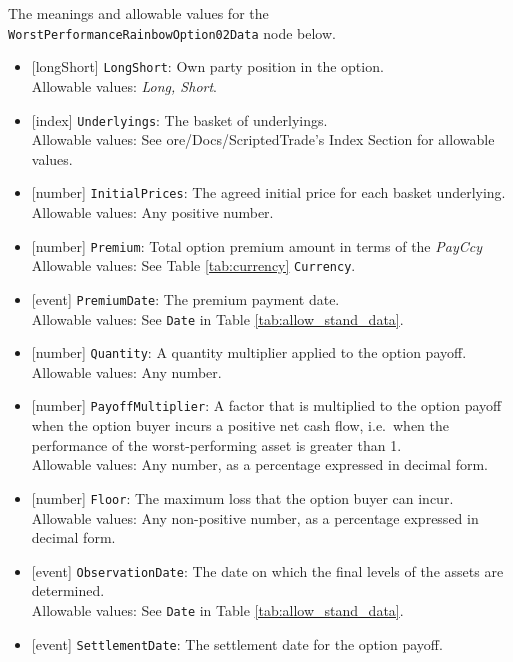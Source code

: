 The meanings and allowable values for the \lstinline!WorstPerformanceRainbowOption02Data! node below.

\begin{itemize} 
  \item{}[longShort] \lstinline!LongShort!: Own party position in the option. \\
  Allowable values: \emph{Long, Short}.
  \item{}[index] \lstinline!Underlyings!: The basket of underlyings. \\
  Allowable values: See ore/Docs/ScriptedTrade's Index Section for allowable values.
  \item{}[number] \lstinline!InitialPrices!: The agreed initial price for each basket underlying. \\
  Allowable values: Any positive number.
  \item{}[number] \lstinline!Premium!: Total option premium amount in terms of the \emph{PayCcy} \\
  Allowable values: See Table \ref{tab:currency} \lstinline!Currency!.
  \item{}[event] \lstinline!PremiumDate!: The premium payment date. \\
  Allowable values: See \lstinline!Date! in Table \ref{tab:allow_stand_data}.
  \item{}[number] \lstinline!Quantity!: A quantity multiplier applied to the option payoff. \\
  Allowable values: Any number.
  \item{}[number] \lstinline!PayoffMultiplier!: A factor that is multiplied to the option payoff when the option buyer incurs 
  a positive net cash flow, i.e.\ when the performance of the worst-performing asset is greater than 1. \\
  Allowable values: Any number, as a percentage expressed in decimal form.
  \item{}[number] \lstinline!Floor!: The maximum loss that the option buyer can incur. \\
  Allowable values: Any non-positive number, as a percentage expressed in decimal form.
  \item{}[event] \lstinline!ObservationDate!: The date on which the final levels of the assets are determined. \\
  Allowable values: See \lstinline!Date! in Table \ref{tab:allow_stand_data}.
  \item{}[event] \lstinline!SettlementDate!: The settlement date for the option payoff. \\

\end{itemize}

